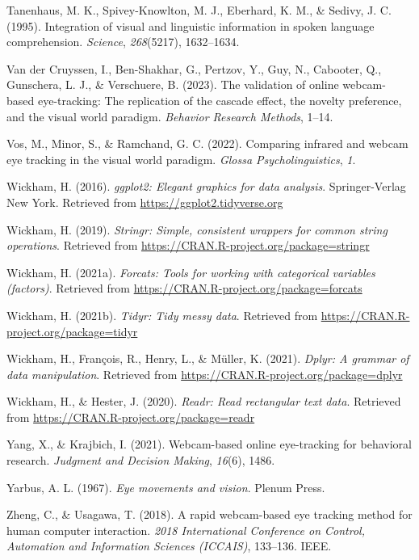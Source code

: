 \documentclass[
  man,floatsintext]{apa6}
\newlength{\cslhangindent}
\newenvironment{CSLReferences}[2] %
 {\begin{list}{}{%
  \setlength{\itemindent}{0pt}
  \setlength{\leftmargin}{0pt}
  \setlength{\parsep}{0pt}
  \ifodd #1
   \setlength{\leftmargin}{\cslhangindent}
   \setlength{\itemindent}{-1\cslhangindent}
  \fi
  \setlength{\itemsep}{#2\baselineskip}}}
 {\end{list}}
\begin{document}
\begin{CSLReferences}{1}{0}
Tanenhaus, M. K., Spivey-Knowlton, M. J., Eberhard, K. M., \& Sedivy, J. C. (1995). Integration of visual and linguistic information in spoken language comprehension. \emph{Science}, \emph{268}(5217), 1632--1634.

Van der Cruyssen, I., Ben-Shakhar, G., Pertzov, Y., Guy, N., Cabooter, Q., Gunschera, L. J., \& Verschuere, B. (2023). The validation of online webcam-based eye-tracking: The replication of the cascade effect, the novelty preference, and the visual world paradigm. \emph{Behavior Research Methods}, 1--14.

Vos, M., Minor, S., \& Ramchand, G. C. (2022). Comparing infrared and webcam eye tracking in the visual world paradigm. \emph{Glossa Psycholinguistics}, \emph{1}.

Wickham, H. (2016). \emph{ggplot2: Elegant graphics for data analysis}. Springer-Verlag New York. Retrieved from \url{https://ggplot2.tidyverse.org}

Wickham, H. (2019). \emph{Stringr: Simple, consistent wrappers for common string operations}. Retrieved from \url{https://CRAN.R-project.org/package=stringr}

Wickham, H. (2021a). \emph{Forcats: Tools for working with categorical variables (factors)}. Retrieved from \url{https://CRAN.R-project.org/package=forcats}

Wickham, H. (2021b). \emph{Tidyr: Tidy messy data}. Retrieved from \url{https://CRAN.R-project.org/package=tidyr}

Wickham, H., François, R., Henry, L., \& Müller, K. (2021). \emph{Dplyr: A grammar of data manipulation}. Retrieved from \url{https://CRAN.R-project.org/package=dplyr}

Wickham, H., \& Hester, J. (2020). \emph{Readr: Read rectangular text data}. Retrieved from \url{https://CRAN.R-project.org/package=readr}

Yang, X., \& Krajbich, I. (2021). Webcam-based online eye-tracking for behavioral research. \emph{Judgment and Decision Making}, \emph{16}(6), 1486.

Yarbus, A. L. (1967). \emph{Eye movements and vision}. Plenum Press.

Zheng, C., \& Usagawa, T. (2018). A rapid webcam-based eye tracking method for human computer interaction. \emph{2018 International Conference on Control, Automation and Information Sciences (ICCAIS)}, 133--136. IEEE.

\end{CSLReferences}

\endgroup
\end{document}
